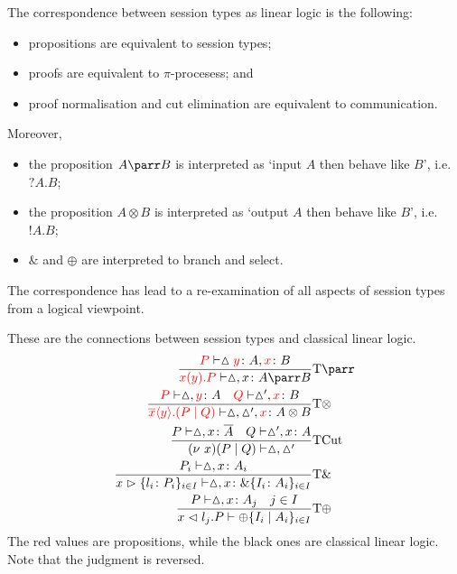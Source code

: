 \documentclass[a4paper, openany]{memoir}
\theoremstyle{definition}
\begin{document}
    The correspondence between session types as linear logic is the following:
    \begin{itemize}
        \item propositions are equivalent to session types;
        \item proofs are equivalent to $\pi$-procesess; and
        \item proof normalisation and cut elimination are equivalent to communication.
    \end{itemize}
    Moreover,
    \begin{itemize}
        \item the proposition $A \parr B$ is interpreted as `input $A$ then behave like $B$', i.e. $?A.B$;
        \item the proposition $A \otimes B$ is interpreted as `output $A$ then behave like $B$', i.e. $!A.B$;
        \item $\&$ and $\oplus$ are interpreted to branch and select.
    \end{itemize}
    The correspondence has lead to a re-examination of all aspects of session types from a logical viewpoint.

    These are the connections between session types and classical linear logic.
    \begin{align*}
        \frac{{\color{red} P} \vdash \vartriangle {\color{red} y} \colon A, {\color{red} x} \colon B}{{\color{red}x(y).P} \vdash \vartriangle, x \colon A \parr B} & \textrm{T}\parr \\
        \frac{{\color{red} P} \vdash \vartriangle, {\color{red} y} \colon A \quad {\color{red} Q} \vdash \vartriangle', {\color{red} x} \colon B}{{\color{red} \overline{x} \langle y \rangle.(P \mid Q)} \vdash \vartriangle, \vartriangle', {\color{red} x} \colon A \otimes B} & \textrm{T}\otimes \\
        \frac{P \vdash \vartriangle, x \colon \overline{A} \quad Q \vdash \vartriangle', x \colon A}{(\nu \ x)(P \mid Q) \vdash \vartriangle, \vartriangle'} & \textrm{TCut} \\
        \frac{P_i \vdash \vartriangle, x \colon A_i}{x \vartriangleright \{l_i \colon P_i\}_{i \in I} \vdash \vartriangle, x \colon \&\{I_i \colon A_i\}_{i \in I}} & \textrm{T} \& \\
        \frac{P \vdash \vartriangle, x \colon A_j \quad j \in I}{x \vartriangleleft l_j.P \vdash \oplus \{I_i \mid A_i\}_{i \in I}} & \textrm{T}\oplus 
    \end{align*}
    The red values are propositions, while the black ones are classical linear logic. Note that the judgment is reversed.
\end{document}
